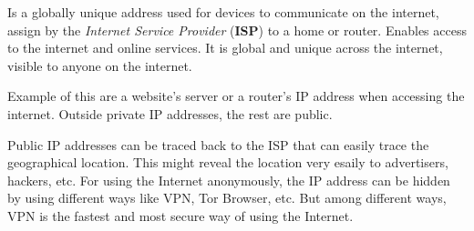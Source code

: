 Is a globally unique address used for devices to communicate on the internet, assign by the \textit{Internet Service Provider} (\textbf{ISP}) to a home or router. Enables access to the internet and online services. It is global and unique across the internet, visible to anyone on the internet.

Example of this are a website's server or a router's IP address when accessing the internet. Outside private IP addresses, the rest are public.

Public IP addresses can be traced back to the ISP that can easily trace the geographical location. This might reveal the location very esaily to advertisers, hackers, etc. For using the Internet anonymously, the IP address can be hidden by using different ways like VPN, Tor Browser, etc. But among different ways, VPN is the fastest and most secure way of using the Internet.
